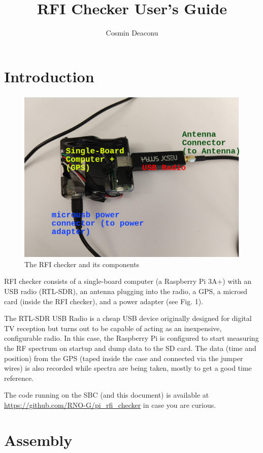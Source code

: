 \documentclass[12pt,letter]{article}
\title{RFI Checker User's Guide}
\author{Cosmin Deaconu}
\begin{document}
 
\maketitle 

\section{Introduction} 

\begin{figure} 
  \centering
\includegraphics[width=5in]{overview} 
\caption{The RFI checker and its components} 
\end{figure}

RFI checker consists of a single-board computer (a Raspberry Pi 3A+)  with an
USB radio (RTL-SDR), an antenna plugging into the radio, a GPS, a microsd card (inside the RFI checker), and a power adapter (see Fig. 1).  
  
The RTL-SDR USB Radio  is a cheap USB device originally designed for digital TV
reception but turns out to be capable of acting as an inexpensive, configurable
radio. In this case, the Raspberry Pi is configured to start measuring the RF
spectrum on startup and dump data to the SD card. The data (time and position)
from the GPS (taped inside the case and connected via the jumper wires) is also
recorded while spectra are being taken, mostly to get a good time reference. 

The code running on the SBC (and this document) is available at \url{https://github.com/RNO-G/pi_rfi_checker} in case you are curious. 

\section{Assembly} 
\end{document}
